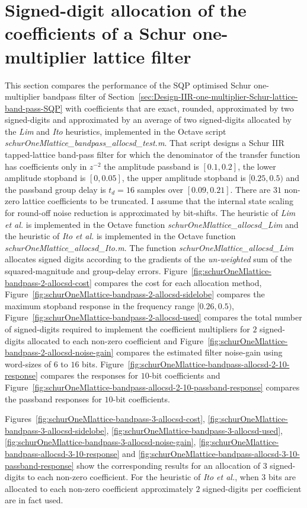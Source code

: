 \documentclass[a4paper,twoside,10pt,english]{report}
\begin{document}
\section{Signed-digit allocation of the coefficients of a Schur one-multiplier lattice filter}
This section compares the performance of the SQP optimised Schur
one-multiplier bandpass filter of
Section~\ref{sec:Design-IIR-one-multiplier-Schur-lattice-band-pass-SQP} with
coefficients that are exact, rounded, approximated by two signed-digits and
approximated by an average of two signed-digits allocated by the \emph{Lim} and
\emph{Ito} heuristics, implemented in the Octave script
\emph{schurOneMlattice\_bandpass\_allocsd\_test.m}. That script designs a Schur
IIR tapped-lattice band-pass filter for which the denominator of the transfer
function has coefficients only in $z^{-2}$ the amplitude passband is
$[0.1,0.2]$, the lower amplitude stopband is $[0, 0.05]$, the upper amplitude 
stopband is $[0.25,0.5)$ and the passband group delay is $t_{d}=16$ samples over
$[0.09,0.21]$. There are $31$ non-zero lattice coefficients to be truncated. I 
assume that the internal state scaling for round-off noise reduction is 
approximated by bit-shifts. The heuristic of \emph{Lim et al.} is implemented 
in the Octave function \emph{schurOneMlattice\_allocsd\_Lim} and the heuristic
of \emph{Ito et al.} is implemented in the Octave function 
\emph{schurOneMlattice\_allocsd\_Ito.m}. The
function \emph{schurOneMlattice\_allocsd\_Lim} allocates signed digits 
according to the gradients of the \emph{un-weighted} sum of the
squared-magnitude and group-delay errors.
Figure~\ref{fig:schurOneMlattice-bandpass-2-allocsd-cost}
compares the cost for each allocation method,
Figure~\ref{fig:schurOneMlattice-bandpass-2-allocsd-sidelobe} compares
the maximum stopband response in the frequency range $[0.26,0.5)$,
Figure~\ref{fig:schurOneMlattice-bandpass-2-allocsd-used} compares the total
number of signed-digits required to implement the coefficient multipliers for
$2$ signed-digits allocated to each non-zero coefficient and
Figure~\ref{fig:schurOneMlattice-bandpass-2-allocsd-noise-gain} compares the 
estimated filter noise-gain using word-sizes of $6$ to $16$ bits. 
Figure~\ref{fig:schurOneMlattice-bandpass-allocsd-2-10-response} compares the
responses for $10$-bit coefficients and
Figure~\ref{fig:schurOneMlattice-bandpass-allocsd-2-10-passband-response}
compares the passband responses for $10$-bit coefficients.

Figures~\ref{fig:schurOneMlattice-bandpass-3-allocsd-cost},
\ref{fig:schurOneMlattice-bandpass-3-allocsd-sidelobe},
\ref{fig:schurOneMlattice-bandpass-3-allocsd-used},
\ref{fig:schurOneMlattice-bandpass-3-allocsd-noise-gain},
\ref{fig:schurOneMlattice-bandpass-allocsd-3-10-response} and
\ref{fig:schurOneMlattice-bandpass-allocsd-3-10-passband-response} show the 
corresponding results for an allocation of $3$ signed-digits to each non-zero 
coefficient. For the heuristic of \emph{Ito et al.}, when $3$ bits are 
allocated to each non-zero coefficient approximately $2$ signed-digits per
coefficient are in fact used. 
\end{document}
